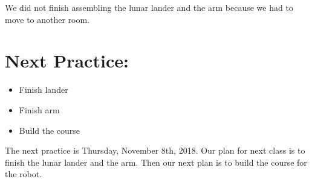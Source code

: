 \documentclass[12pt]{article}
\begin{document}
 

We did not finish assembling the lunar lander and the arm because we had to move to  another room. 



\section{Next Practice:}
\begin{itemize}
	\item Finish lander
	\item Finish arm
	\item Build the course
\end{itemize}

The next practice is Thursday, November 8th, 2018. Our plan for next class is to finish the lunar lander and the arm. Then our next plan is to build the course for the robot. 
\end{document}

